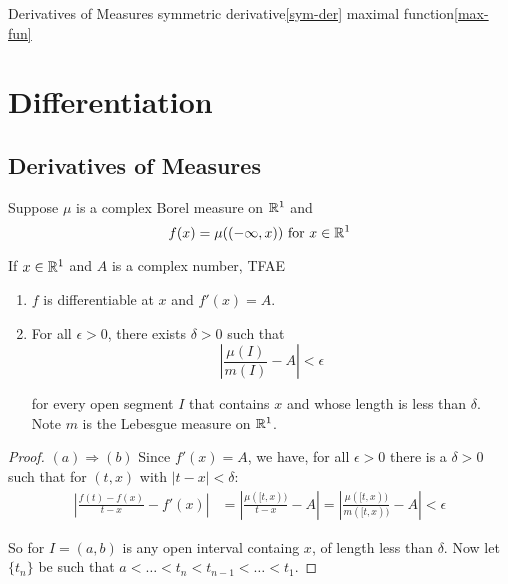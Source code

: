 

    
\begin{theindex}
    \item Derivatives of Measures
    \subitem symmetric derivative\ref{sym-der}
    \subitem maximal function\ref{max-fun}
\end{theindex}
\section{Differentiation}
\subsection{Derivatives of Measures}
\begin{theorem}
    Suppose $\mu$ is a complex Borel measure on $\mathbb{R}^1$ and \begin{equation}
        f(x) = \mu((-\infty, x)) \text{ for }x\in \mathbb{R}^1
    \end{equation}

    If $x\in \mathbb{R}^1$ and $A$ is a complex number, TFAE\begin{enumerate}[label = (\alph*)]
        \item $f$ is differentiable at $x$ and $f'(x) = A$.
        \item For all $\epsilon>0$, there exists $\delta>0$ such that\begin{equation}
            |\frac{\mu(I)}{m(I)}-A|<\epsilon
        \end{equation}

        for every open segment $I$ that contains $x$ and whose length is less than $\delta$. Note $m$ is the Lebesgue measure on $\mathbb{R}^1$.
    \end{enumerate}

    \begin{proof}
        $(a)\Rightarrow (b)$         
        Since $f'(x) = A$, we have, for all $\epsilon>0$ there is a $\delta>0$ such that for $(t,x)$ with $|t-x|<\delta$:\begin{align*}
            |\frac{f(t)-f(x)}{t-x} - f'(x)| &= |\frac{\mu([t,x))}{t-x} - A| = |\frac{\mu([t,x))}{m([t,x))} - A| <\epsilon \tag{$\dagger$}
        \end{align*}

        So for $I = (a,b)$ is any open interval containg $x$, of length less than $\delta$. Now let $\{t_n\}$ be such that $a<\ldots<t_n<t_{n-1}<\ldots < t_1$.
    \end{proof}
\end{theorem}

